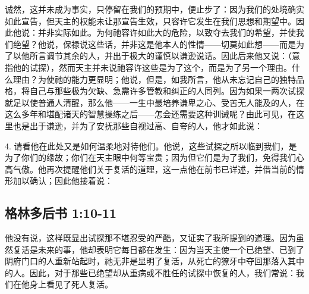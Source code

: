 诚然，这并未成为事实，只停留在我们的预期中，便止步了：因为我们的处境确实如此宣告，但天主的权能未让那宣告生效，只容许它发生在我们思想和期望中。因此他说：并非实际如此。为何祂容许如此大的危险，以致夺去我们的希望，并使我们绝望？他说，保禄说这些话，并非这是他本人的性情——切莫如此想——而是为了以他所言调节其余的人，并出于极大的谨慎以谦逊说话。因此后来他又说：（意指他的试探），然而天主并未说祂容许这些是为了这个，而是为了另一个理由。什么理由？为使祂的能力更显明；他说，但是，如我所言，他从未忘记自己的独特品格，将自己与那些极为欠缺、急需许多管教和纠正的人同列。因为如果一两次试探就足以使普通人清醒，那么他——一生中最培养谦卑之心、受苦无人能及的人，在这么多年和堪配诸天的智慧操练之后——怎会还需要这种训诫呢？由此可见，在这里也是出于谦逊，并为了安抚那些自视过高、自夸的人，他才如此说：\par

4. 请看他在此处又是如何温柔地对待他们。他说，这些试探之所以临到我们，是为了你们的缘故；你们在天主眼中何等宝贵；因为但它们是为了我们，免得我们心高气傲。他再次提醒他们关于复活的道理，这一点他在前书已详述，并借当前的情形加以确认；因此他接着说：\par


\subsection{格林多后书 1:10-11}

\par

他没有说，这样既显出试探那不堪忍受的严酷，又证实了我所提到的道理。因为虽然复活是未来的事，他却表明它每日都在发生：因为当天主使一个已绝望、已到了阴府门口的人重新站起时，祂无非是显明了复活，从死亡的獠牙中夺回那落入其中的人。因此，对于那些已绝望却从重病或不胜任的试探中恢复的人，我们常说：我们在他身上看见了死人复活。\par

\par

